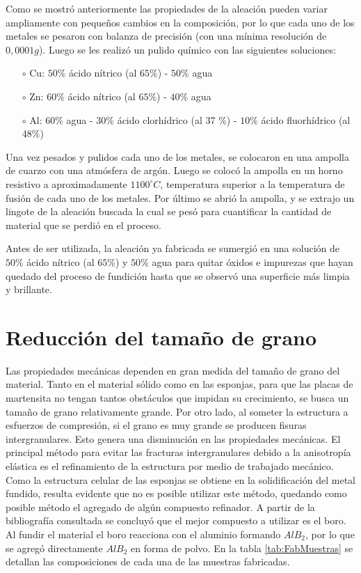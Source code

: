 \documentclass[a4paper,12pt,fleqn,twoside,openany]{book}
\begin{document}
Como se mostró anteriormente las propiedades de la aleación pueden variar ampliamente 
con pequeños cambios en la composición, por lo que cada uno de los metales se pesaron con balanza de precisión (con una mínima resolución de $0,0001g$). 
Luego se les realizó un pulido químico con las siguientes soluciones:
\begin{itemize}
 \item[$\circ$] Cu: $50 \%$ ácido nítrico (al $65 \%$) - $50 \%$ agua
 \item[$\circ$] Zn: $60 \%$ ácido nítrico (al $65 \%$) - $40 \%$ agua
 \item[$\circ$] Al: $60 \%$ agua - $30 \%$ ácido clorhídrico (al 37 \%) - $10 \%$ ácido fluorhídrico (al $48 \%$)
\end{itemize}

Una vez pesados y pulidos cada uno de los metales, se colocaron en una ampolla de cuarzo con una atmósfera de argón. Luego se colocó la ampolla en 
un horno resistivo a aproximadamente $1100^\circ C$, temperatura superior a la temperatura de fusión de cada uno de los metales. Por último se abrió la ampolla, y se extrajo un 
lingote de la aleación buscada la cual se pesó para cuantificar la cantidad de material que se perdió en el proceso.  

Antes de ser utilizada, la aleación ya fabricada se sumergió en una solución de $50 \%$ ácido nítrico (al $65 \%$) y 
$50 \%$ agua para quitar óxidos e impurezas que hayan quedado del proceso de fundición hasta que se observó una superficie más limpia y brillante.

\section{Reducción del tamaño de grano} \label{FabClavos}


Las propiedades mecánicas dependen en gran medida del tamaño de grano del material. Tanto en el material sólido como en las esponjas, para que las placas de martensita no tengan tantos obstáculos que impidan su crecimiento, se busca un tamaño de grano relativamente grande. Por otro 
lado, al someter la estructura a esfuerzos de compresión, si el grano es muy grande se producen fisuras intergranulares. Esto genera 
una disminución en las propiedades mecánicas. El principal método para evitar las fracturas intergranulares debido a la anisotropía elástica es el refinamiento de la estructura por medio de trabajado mecánico. Como la estructura 
celular de las esponjas se obtiene en la solidificación del metal fundido, resulta evidente que no es posible utilizar este método, quedando como posible método el agregado de algún compuesto refinador. A partir de la bibliografía consultada se concluyó que el 
mejor compuesto a utilizar es el boro. Al fundir el material el boro reacciona con el aluminio formando $AlB_2$, por lo que se agregó directamente $AlB_2$ en forma de polvo. En la tabla \ref{tab:FabMuestras} se detallan las composiciones de cada una de las muestras fabricadas. 
\end{document}
